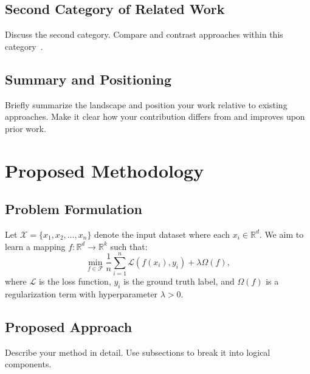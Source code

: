 \documentclass[conference,10pt]{IEEEtran}
\newcommand{\R}{\mathbb{R}}        %
\begin{document}
\subsection{Second Category of Related Work}
\label{subsec:related_category_2}
Discuss the second category. Compare and contrast approaches within
this category~\cite{ref_related_3}.

\subsection{Summary and Positioning}
Briefly summarize the landscape and position your work relative to
existing approaches. Make it clear how your contribution differs from
and improves upon prior work.

\section{Proposed Methodology}
\label{sec:methodology}

\subsection{Problem Formulation}
\label{subsec:problem_formulation}
Let $\mathcal{X} = \{x_1, x_2, \ldots, x_n\}$ denote the input dataset
where each $x_i \in \R^d$. We aim to learn a mapping
$f: \R^d \rightarrow \R^k$ such that:
%
\begin{equation}
    \label{eq:objective}
    \min_{f \in \mathcal{F}} \frac{1}{n} \sum_{i=1}^{n}
    \mathcal{L}(f(x_i), y_i) + \lambda \Omega(f),
\end{equation}
%
where $\mathcal{L}$ is the loss function, $y_i$ is the ground truth
label, and $\Omega(f)$ is a regularization term with hyperparameter
$\lambda > 0$.

\subsection{Proposed Approach}
\label{subsec:proposed_approach}
Describe your method in detail. Use subsections to break it into
logical components.
\end{document}
